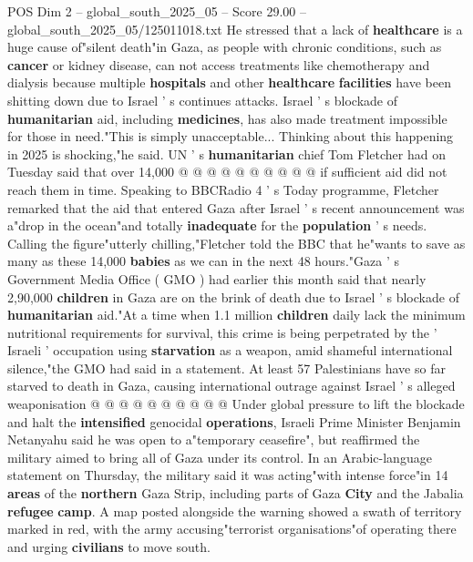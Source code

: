 \begin{textsample}{POS Dim 2 – global\_south\_2025\_05 – Score 29.00 – global\_south\_2025\_05/125011018.txt}
He stressed that a lack of \textbf{healthcare} is a huge cause of"silent death"in Gaza, as people with chronic conditions, such as \textbf{cancer} or kidney disease, can not access treatments like chemotherapy and dialysis because multiple \textbf{hospitals} and other \textbf{healthcare} \textbf{facilities} have been shitting down due to Israel ' s continues attacks.
Israel ' s blockade of \textbf{humanitarian} aid, including \textbf{medicines}, has also made treatment impossible for those in need."This is simply unacceptable...
Thinking about this happening in 2025 is shocking,"he said.
UN ' s \textbf{humanitarian} chief Tom Fletcher had on Tuesday said that over 14,000 @ @ @ @ @ @ @ @ @ @ if sufficient aid did not reach them in time.
Speaking to BBCRadio 4 ' s Today programme, Fletcher remarked that the aid that entered Gaza after Israel ' s recent announcement was a"drop in the ocean"and totally \textbf{inadequate} for the \textbf{population} ' s needs.
Calling the figure"utterly chilling,"Fletcher told the BBC that he"wants to save as many as these 14,000 \textbf{babies} as we can in the next 48 hours."Gaza ' s Government Media Office ( GMO ) had earlier this month said that nearly 2,90,000 \textbf{children} in Gaza are on the brink of death due to Israel ' s blockade of \textbf{humanitarian} aid."At a time when 1.1 million \textbf{children} daily lack the minimum nutritional requirements for survival, this crime is being perpetrated by the ' Israeli ' occupation using \textbf{starvation} as a weapon, amid shameful international silence,"the GMO had said in a statement.
At least 57 Palestinians have so far starved to death in Gaza, causing international outrage against Israel ' s alleged weaponisation @ @ @ @ @ @ @ @ @ @ Under global pressure to lift the blockade and halt the \textbf{intensified} genocidal \textbf{operations}, Israeli Prime Minister Benjamin Netanyahu said he was open to a"temporary ceasefire", but reaffirmed the military aimed to bring all of Gaza under its control.
In an Arabic-language statement on Thursday, the military said it was acting"with intense force"in 14 \textbf{areas} of the \textbf{northern} Gaza Strip, including parts of Gaza \textbf{City} and the Jabalia \textbf{refugee} \textbf{camp}.
A map posted alongside the warning showed a swath of territory marked in red, with the army accusing"terrorist organisations"of operating there and urging \textbf{civilians} to move south.

\end{textsample}
